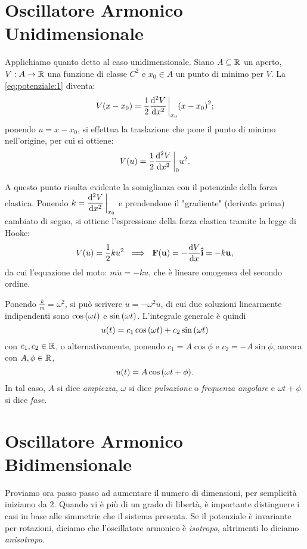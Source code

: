 \section{Oscillatore Armonico Unidimensionale}
    Applichiamo quanto detto al caso unidimensionale. Siano $A\subseteq\mathbb{R}$ un aperto, $V:A\rightarrow\mathbb{R}$ una funzione di classe $C^2$ e $x_0\in A$ un punto di minimo per $V$. La \eqref{eq:potenziale:1} diventa: $$V(x-x_0)=\frac{1}{2}\dv[2]{V}{x}\eval_{x_0}\qty(x-x_0)^2;$$ ponendo $u=x-x_0$, si effettua la traslazione che pone il punto di minimo nell'origine, per cui si ottiene: $$V(u)=\frac{1}{2}\dv[2]{V}{x}\eval_{0}u^2.$$ \par A questo punto risulta evidente la somiglianza con il potenziale della forza elastica. Ponendo $\displaystyle k=\dv[2]{V}{x}\eval_{x_0}$ e prendendone il "gradiente" (derivata prima) cambiato di segno, si ottiene l'espressione della forza elastica tramite la legge di Hooke: $$V\qty(u)=\frac{1}{2}ku^2\ \implies\ \vb{F\qty(\vb{u})}=-\dv{V}{x}\vu{i}=-k\vb{u},$$ da cui l'equazione del moto: $m\ddot{u}=-ku$, che \`e lineare omogenea del secondo ordine. \par Ponendo $\frac{k}{m}=\omega^2$, si pu\`o scrivere $\ddot{u}=-\omega^2u$, di cui due soluzioni linearmente indipendenti sono $\cos\qty(\omega t)$ e $\sin\qty(\omega t)$. L'integrale generale \`e quindi $$u\qty(t)=c_1\cos\qty(\omega t)+c_2\sin\qty(\omega t)$$ con $c_1,c_2\in\mathbb{R}$, o alternativamente, ponendo $c_1=A\cos\phi$ e $c_2=-A\sin\phi$, ancora con $A,\phi\in\mathbb{R}$, $$u\qty(t)=A\cos\qty(\omega t+\phi).$$ In tal caso, $A$ si dice \emph{ampiezza}, $\omega$ si dice \emph{pulsazione} o \emph{frequenza angolare} e $\omega t+\phi$ si dice \emph{fase}.
\section{Oscillatore Armonico Bidimensionale}
    Proviamo ora passo passo ad aumentare il numero di dimensioni, per semplicit\`a iniziamo da 2. Quando vi \`e pi\`u di un grado di libert\`a, \`e importante distinguere i casi in base alle simmetrie che il sistema presenta. Se il potenziale \`e invariante per rotazioni, diciamo che l'oscillatore armonico \`e \emph{isotropo}, altrimenti lo diciamo \emph{anisotropo}.
